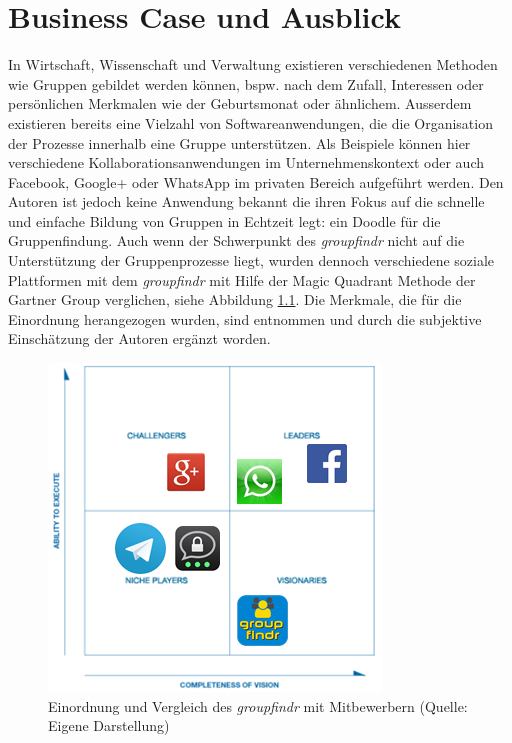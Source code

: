 \chapter{Business Case und Ausblick}
\label{business_case}

In Wirtschaft, Wissenschaft und Verwaltung existieren verschiedenen Methoden wie Gruppen gebildet werden können, bspw. nach dem Zufall, Interessen oder persönlichen Merkmalen wie der Geburtsmonat oder ähnlichem. Ausserdem existieren bereits eine Vielzahl von Softwareanwendungen, die die Organisation der Prozesse innerhalb eine Gruppe unterstützen. Als Beispiele können hier verschiedene Kollaborationsanwendungen im Unternehmenskontext oder auch Facebook, Google+ oder WhatsApp im privaten Bereich aufgeführt werden. Den Autoren ist jedoch keine Anwendung bekannt die ihren Fokus auf die schnelle und einfache Bildung von Gruppen in Echtzeit legt: ein Doodle für die Gruppenfindung. 
\newline\newline
Auch wenn der Schwerpunkt des \emph{groupfindr} nicht auf die Unterstützung der Gruppenprozesse liegt, wurden dennoch verschiedene soziale Plattformen mit dem \emph{groupfindr} mit Hilfe der Magic Quadrant Methode der Gartner Group \citet{magic_quadrant} verglichen, siehe Abbildung \ref{magic_quadrant}.  Die Merkmale, die für die Einordnung herangezogen wurden, sind \citet{gruppen-bildung} entnommen und durch die subjektive Einschätzung der Autoren ergänzt worden.

\begin{figure}[h]
\centering
\includegraphics{graphiken/magic_quadrant.png}%
\caption{Einordnung und Vergleich des \emph{groupfindr} mit Mitbewerbern (Quelle: Eigene Darstellung)}%
\label{magic_quadrant}%
\end{figure}

